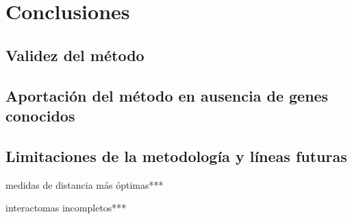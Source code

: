 \chapter{Conclusiones}

\section{Validez del método}


\section{Aportación del método en ausencia de genes conocidos}


\section{Limitaciones de la metodología y líneas futuras}


medidas de distancia más óptimas***

interactomas incompletos***